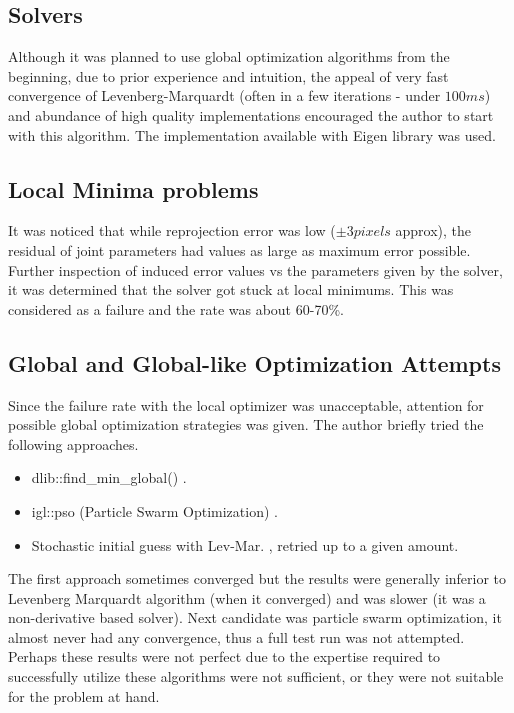 \documentclass[english, printversion, nomenclature, notitle]{tuvisionthesis} %
\begin{document}
\subsection{Solvers}
\label{subsec:eval_solvers}

Although it was planned to use global optimization algorithms from the beginning, due to prior experience and intuition, the appeal of very fast convergence of Levenberg-Marquardt \cite{lev-mar} (often in a few iterations - under $100ms$) and abundance of high quality implementations encouraged the author to start with this algorithm. The implementation available with Eigen library \cite{eigenweb} was used.

\subsection{Local Minima problems}
It was noticed that while reprojection error was low ($\pm3 pixels$ approx), the residual of joint parameters had values as large as maximum error possible. Further inspection of induced error values vs the parameters given by the solver, it was determined that the solver got stuck at local minimums. This was considered as a failure and the rate was about 60-70\%.

\subsection{Global and Global-like Optimization Attempts}
\label{subsec:global_global_like}
Since the failure rate with the local optimizer was unacceptable, attention for possible global optimization strategies was given. The author briefly tried the following approaches.
\begin{itemize}
	\item dlib::find\_min\_global() \cite{dlib09}.
	\item igl::pso (Particle Swarm Optimization) \cite{libigl}.
	\item Stochastic initial guess with Lev-Mar. \cite{lev-mar, eigenweb}, retried up to a given amount.
\end{itemize}

The first approach sometimes converged but the results were generally inferior to Levenberg Marquardt algorithm (when it converged) and was slower (it was a non-derivative based solver). Next candidate was particle swarm optimization, it almost never had any convergence, thus a full test run was not attempted. Perhaps these results were not perfect due to the expertise required to successfully utilize these algorithms were not sufficient, or they were not suitable for the problem at hand.
\end{document}
